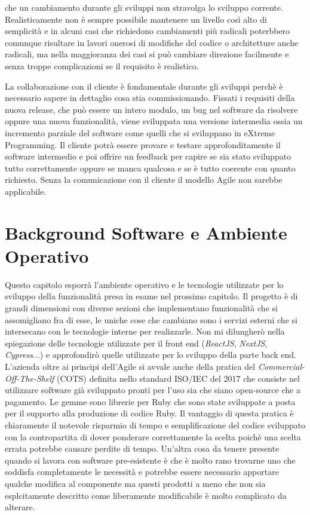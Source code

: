 \documentclass[target=bach,aauheader=,style=]{thud}
\begin{document}
che un cambiamento durante gli sviluppi non stravolga lo sviluppo corrente. Realisticamente non è sempre possibile mantenere un livello così alto di semplicità
e in alcuni casi che richiedono cambiamenti più radicali poterbbero comunque risultare in lavori onerosi di modifiche del codice o architetture anche radicali,
ma nella maggioranza dei casi si può cambiare direzione facilmente e senza troppe complicazioni se il requisito è realistico.
\par La collaborazione con il cliente è fondamentale durante gli sviluppi perchè è necessario sapere in dettaglio cosa stia commissionando.
Fissati i requisiti della nuova release, che può essere un intero modulo, un bug nel software da risolvere oppure una nuova funzionalità, viene sviluppata
una versione intermedia ossia un incremento parziale del software come quelli che si sviluppano in eXtreme Programming. Il cliente potrà essere provare e
testare approfonditamente il software intermedio e poi offrire un feedback per capire se sia stato sviluppato tutto correttamente oppure se manca qualcosa
e se è tutto coerente con quanto richiesto. Senza la comunicazione con il cliente il modello Agile non sarebbe applicabile.

\chapter{Background Software e Ambiente Operativo}

Questo capitolo esporrà l'ambiente operativo e le tecnologie utilizzate per lo sviluppo della funzionalità presa in esame nel prossimo capitolo.
Il progetto è di grandi dimensioni con diverse sezioni che implementano funzionalità che si assomigliano fra di esse, le uniche cose che cambiano
sono i servizi esterni che si intersecano con le tecnologie interne per realizzarle.
Non mi dilungherò nella spiegazione delle tecnologie utilizzate per il front end (\textit{ReactJS}\cite{react_dev_home}, \textit{NextJS}\cite{nextjs_home},
\textit{Cypress}\cite{cypress}...) e approfondirò quelle utilizzate per lo sviluppo della parte back end. 
L'azienda oltre ai principi dell'Agile si avvale anche della pratica del \textit{Commercial-Off-The-Shelf} (COTS) definita nello standard ISO/IEC del 2017\cite{iso_iec_12207_2017}
che consiste nel utilizzare software già sviluppato pronti per l'uso sia che siano open-source che a pagamento. Le gemme sono librerie per Ruby che sono state sviluppate a posta
per il supporto alla produzione di codice Ruby. Il vantaggio di questa pratica è chiaramente il notevole risparmio di tempo e semplificazione del codice sviluppato con la
contropartita di dover ponderare correttamente la scelta poichè una scelta errata potrebbe causare perdite di tempo. Un'altra cosa da tenere presente quando si
lavora con software pre-esistente è che è molto rano trovarne uno che soddisfa completamente le necessità e potrebbe essere necessario apportare qualche modifica al
componente ma questi prodotti a meno che non sia esplcitamente descritto come liberamente modificabile è molto complicato da alterare.
\end{document}
